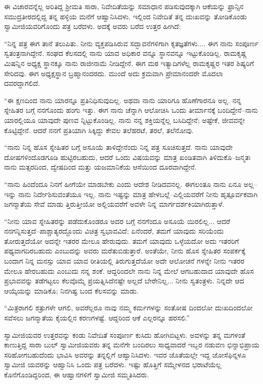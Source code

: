 ಈ ವಿಚಾರವನ್ನೆಲ್ಲ ಅರಿತಿದ್ದ ಶ್ರೀಮತಿ ಸಾರಾ, ನಿವೇದಿತೆಯನ್ನು ಸಮಾಧಾನ ಪಡಿಸುವುದಕ್ಕಾಗಿ ಆಕೆಯನ್ನು ಫ್ರಾನ್ಸಿನ ಸಮುದ್ರತೀರದಲ್ಲಿದ್ದ ತನ್ನ ಹಳ್ಳಿಯ ಮನೆಗೆ ಆಹ್ವಾನಿಸಿದಳು. ಇಲ್ಲಿಂದ ನಿವೇದಿತೆ ತನ್ನ ದುಃಖವನ್ನು ತೋಡಿಕೊಂಡು ಸ್ವಾಮೀಜಿಯವರಿಗೊಂದು ಪತ್ರ ಬರೆದಳು. ಅದಕ್ಕೆ ಅವರು ಬರೆದ ಉತ್ತರ ಹೀಗಿದೆ:

“ನಿನ್ನ ಪತ್ರ ಈಗ ತಾನೆ ತಲುಪಿತು. ನೀನು ವ್ಯಕ್ತಪಡಿಸಿರುವ ಸದ್ಭಾವನೆಗಳಿಗಾಗಿ ಕೃತಜ್ಞತೆಗಳು.... ಈಗ ನಾನು ಸಂಪೂರ್ಣ ಸ್ವತಂತ್ರನಾಗಿದ್ದೇನೆ. ಸಂಘದ ಕೆಲಸದಲ್ಲಿ ನಾನು ಯಾವ ಅಧಿಕಾರ ವನ್ನೂ ಸ್ಥಾನವನ್ನೂ ಇಟ್ಟುಕೊಂಡಿಲ್ಲ. ರಾಮಕೃಷ್ಣ ಮಿಷನ್ನಿನ ಅಧ್ಯಕ್ಷ ಸ್ಥಾನಕ್ಕೂ ನಾನು ರಾಜೀನಾಮೆ ನೀಡಿದ್ದೇನೆ. ಈಗ ಮಠ ಇತ್ಯಾದಿಗಳೆಲ್ಲ ರಾಮಕೃಷ್ಣರ ಇತರ ಶಿಷ್ಯರಿಗೆ ಸೇರಿದವು. ಈಗ ಅಧ್ಯಕ್ಷಸ್ಥಾನ ಬ್ರಹ್ಮಾನಂದರದು. ಮುಂದೆ ಅದು ಕ್ರಮವಾಗಿ ಪ್ರೇಮಾನಂದರೇ ಮೊದಲಾ ದವರದ್ದಾಗಲಿದೆ.

“ಈ ಕ್ಷಣದಿಂದ ನಾನು ಯಾರನ್ನೂ ಪ್ರತಿನಿಧಿಸುವುದಿಲ್ಲ. ಅಥವಾ ನಾನು ಯಾರಿಗೂ ಹೊಣೆಗಾರನೂ ಅಲ್ಲ. ನನ್ನ ಸ್ನೇಹಿತರ ಬಗ್ಗೆ ನನಗೊಂದು ಹಂಗು ಇತ್ತು. ಈಗ ನಾನು ಚೆನ್ನಾಗಿ ಆಲೋಚಿಸಿ ಒಂದು ತೀರ್ಮಾನಕ್ಕೆ ಬಂದಿದ್ದೇನೆ–ನಾನು ಯಾರಲ್ಲಿಯೂ ಯಾವುದೇ ಪುಣವ ನ್ನಿಟ್ಟುಕೊಂಡಿಲ್ಲ. ನಾನು ನನ್ನ ಶಕ್ತಿಯನ್ನೆಲ್ಲ ಬಸಿದಿದ್ದೇನೆ; ಅಷ್ಟೇಕೆ, ಜೀವವನ್ನೇ ಕೊಟ್ಟಿದ್ದೇನೆ. ಆದರೆ ನನಗೆ ಪ್ರತಿಯಾಗಿ ಸಿಕ್ಕಿದ್ದು ಕೇವಲ ತಲೆಹರಟೆ, ತರಲೆ, ತಲೆನೋವು.

“ನಾನು ನಿನ್ನ ಹೊಸ ಸ್ನೇಹಿತರ ಬಗ್ಗೆ ಅಸೂಯೆ ತಾಳಿದ್ದೇನೆಂದು ನಿನ್ನ ಪತ್ರ ಸೂಚಿಸುತ್ತದೆ. ನಾನು ಯಾವುದೇ ದೋಷಗಳಿಂದೊಡಗೂಡಿ ಹುಟ್ಟಿರಬಹುದು, ಆದರೆ ಒಂದು ವಿಷಯವನ್ನು ಮಾತ್ರ ಖಂಡಿತವಾಗಿ ತಿಳಿದುಕೊ–ಜನ್ಮತಃ ನಾನು ಮತ್ಸರದಿಂದ, ದ್ವೇಷದಿಂದ ಮತ್ತು ಯಜಮಾನಿಕೆಯ ಆಸೆಯಿಂದ ದೂರವಾಗಿದ್ದೇನೆ. 

“ನಾನು ಹಿಂದೆಂದೂ ನಿನಗೆ ಹೀಗೆಯೇ ಮಾಡಬೇಕು ಎಂದು ಆದೇಶ ನೀಡಿದವನಲ್ಲ. ಈಗಲಂತೂ ನಾನು ಏನೂ ಅಲ್ಲ–ಇನ್ನು ನಾನು ನಿರ್ದೇಶಿಸುವಂತೆಯೂ ಇಲ್ಲ. ನಾನು ಇಷ್ಟನ್ನು ಮಾತ್ರ ಹೇಳಬಲ್ಲೆ–ಎಲ್ಲಿಯವರೆಗೆ ನೀನು ಹೃತ್ಪೂರ್ವಕವಾಗಿ ಜಗನ್ಮಾತೆಯ ಸೇವೆ ಮಾಡು ತ್ತಿರುತ್ತೀಯೋ ಅಲ್ಲಿಯವರೆಗೆ ಅವಳೇ ನಿನ್ನ ಮಾರ್ಗದರ್ಶಕಿಯಾಗಿರುತ್ತಾಳೆ.

“ನೀನು ಯಾವ ಸ್ನೇಹಿತರನ್ನು ಪಡೆದುಕೊಂಡರೂ ಅದರ ಬಗ್ಗೆ ನನಗೆಂದೂ ಅಸೂಯೆ ಯಿರಲಿಲ್ಲ... ಆದರೆ ನನಗನ್ನಿಸುತ್ತದೆ–ಪಾಶ್ಚಾತ್ಯರದ್ದೊಂದು ವಿಚಿತ್ರ ಸ್ವಭಾವವಿದೆ; ಏನೆಂದರೆ, ತಮಗೆ ಯಾವುದು ಸರಿಯೆಂದು ತೋರುತ್ತದೆಯೋ ಅದನ್ನೇ ಇತರರ ಮೇಲೂ ಹೇರುವುದು. ತಮಗೆ ಯಾವುದು ಒಳ್ಳೆಯದೋ ಅದು ಇತರರಿಗೆ ಪಥ್ಯವಾಗದಿರಬಹುದು ಎಂಬುದನ್ನು ಅವರು ಮರೆತುಬಿಡುತ್ತಾರೆ. ಅಂತೆಯೇ, ನೀನು ಹೊಸ ಸ್ನೇಹಿತರ ಸಂಪರ್ಕಕ್ಕೆ ಬಂದಾಗ ನಿನ್ನ ಮನಸ್ಸು ಯಾವ ಯಾವ ರೀತಿಯಲ್ಲಿ ತಿರುಗುತ್ತದೆಯೋ ಅದೇ ಆಲೋಚನೆ ಗಳನ್ನೇ ನೀನು ಇತರರ ಮೇಲೂ ಹೇರಬಹುದು ಎಂಬುದು ನನ್ನ ಶಂಕೆ. ಆದ್ದರಿಂದಲೇ ನಾನು ನಿನ್ನ ಮೇಲೆ ಆಗಬಹುದಾದ ಯಾವುದೇ ಹೊಸ ಪ್ರಭಾವವನ್ನು ತಡೆಗಟ್ಟಲು ಕೆಲವೊಮ್ಮೆ ಪ್ರಯತ್ನಿಸಿದೆನಷ್ಟೇ ಅಲ್ಲದೆ ಬೇರೇನಿಲ್ಲ... ನೀನು ಸ್ವತಂತ್ರಳು. ನಿನ್ನದೇ ಆದ ಆಯ್ಕೆಯನ್ನು ಮಾಡಿಕೊ; ನಿನಗಿಷ್ಟ ಬಂದ ಕೆಲಸವನ್ನು ಮಾಡು.

“ಮಿತ್ರರಾಗಲಿ ಶತ್ರುಗಳೇ ಆಗಲಿ, ಅವರೆಲ್ಲರೂ ನಾವು ನಮ್ಮ ಕರ್ಮಗಳನ್ನು ಸಂತೋಷ ದಿಂದಲೋ ದುಃಖದಿಂದಲೋ ಸವೆಸಲು ಜಗನ್ಮಾತೆಯ ಕೈಯಲ್ಲಿನ ಕರಣಗಳಷ್ಟೆ. ಆದ್ದರಿಂದ ಆಕೆ ಎಲ್ಲರನ್ನೂ ಹರಸಲಿ.”

ಸ್ವಾಮೀಜಿಯವರ ಉತ್ತರವನ್ನು ಕಂಡು ನಿವೇದಿತೆ ಸಂಪೂರ್ಣ ಕುಸಿದು ಹೋಗಿಬಿಟ್ಟಳು. ಅವಳನ್ನು ತನ್ನ ಮಗಳಂತೆ ಕಾಣುತ್ತಿದ್ದ ಸಾರಾ ಬುಲ್ ಸ್ವಾಮೀಜಿಯವರು ತನ್ನ ಮನೆಗೇ ಬಂದಿರಲು ಸಾಧ್ಯವಾದರೆ ಇಬ್ಬರ ನಡುವಣ ಭಿನ್ನಾಭಿಪ್ರಾಯ ಸರಿಹೋಗಬಹುದೆಂದು ಭಾವಿಸಿ ಅವರನ್ನು ತನ್ನಲ್ಲಿಗೆ ಆಹ್ವಾನಿಸಿದಳು. ಇವರ ಜೊತೆಯಲ್ಲೇ ಇದ್ದ ಜೋಸೆಫಿನ್ನಳೂ ಸ್ವಾಮೀಜಿ ಯವರನ್ನು ಆಹ್ವಾನಿಸಿ ಒಂದು ಪತ್ರ ಬರೆದಳು. ಇಷ್ಟು ಹೊತ್ತಿಗೆ ಸಮ್ಮೇಳನದ ಭರಾಟೆಯೆಲ್ಲ ಕೊನೆಗೊಂಡಿದ್ದರಿಂದ, ಈ ಆಹ್ವಾನಗಳಿಗೆ ಸ್ವಾಮೀಜಿ ಸಮ್ಮತಿಸಿದರು.

